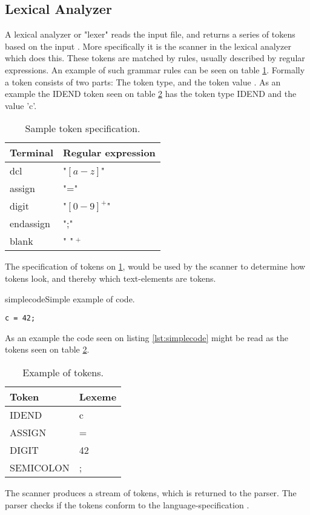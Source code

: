 \subsection{Lexical Analyzer}
A lexical analyzer or "lexer" reads the input file, and returns a series of tokens based on the input \citep{CraftingACompiler}. More specifically it is the scanner in the lexical analyzer which does this. These tokens are matched by rules, usually described by regular expressions. An example of such grammar rules can be seen on table \ref{tab:tokenspecification}. Formally a token consists of two parts: The token type, and the token value \citep{CraftingACompiler}. As an example the IDEND token seen on table \ref{tab:tokensexample} has the token type IDEND and the value 'c'. 

\begin{table}[H]
\begin{tabular}{|l|l|}
\hline
    	Terminal  	& Regular expression 	\\ \hline
    	dcl       	& "$[a-z]$"      		\\ 
    	assign    	& "="      				\\ 
    	digit     	& "$[0-9]^+$"   		\\ 
    	endassign 	& ";"      				\\
    	blank 		& " "$~^+$				\\
    \hline
\end{tabular}
\caption{Sample token specification.}
\label{tab:tokenspecification}
\end{table}
The specification of tokens on \ref{tab:tokenspecification}, would be used by the scanner to determine how tokens look, and thereby which text-elements are tokens. 

\begin{code}{simplecode}{Simple example of code.}
\begin{lstlisting}
c = 42;
\end{lstlisting}
\end{code}

As an example the code seen on listing \ref{lst:simplecode} might be read as the tokens seen on table \ref{tab:tokensexample}.
\begin{table}[H]
\begin{tabular}{|l|l|}
\hline
    \textbf{Token}	&	\textbf{Lexeme} \\ \hline
    IDEND     		&	c      			\\ 
    ASSIGN    		&	=      			\\ 
    DIGIT     		&	42    			\\ 
    SEMICOLON 		&	;      			\\ \hline
\end{tabular}
\caption{Example of tokens.}
\label{tab:tokensexample}
\end{table}
The scanner produces a stream of tokens, which is returned to the parser. The parser checks if the tokens conform to the language-specification \citep{CraftingACompiler}.